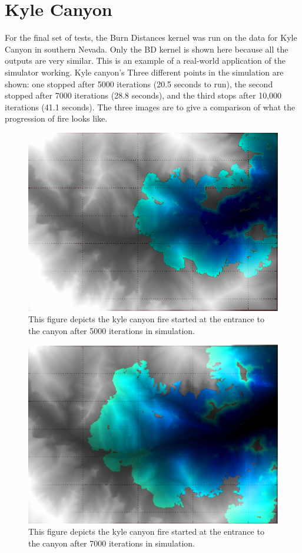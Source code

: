 \section{Kyle Canyon}
For the final set of tests, the Burn Distances kernel was run on the data for Kyle Canyon in southern Nevada. Only the BD kernel is shown here because all the outputs are very similar. This is an example of a real-world application of the simulator working. Kyle canyon's  Three different points in the simulation are shown: one stopped after 5000 iterations (20.5 seconds to run), the second stopped after 7000 iterations (28.8 seconds), and the third stops after 10,000 iterations (41.1 seconds). The three images are to give a comparison of what the progression of fire looks like. 
\begin{figure}%
\centering
  \includegraphics[height=.4\textheight]{figures/results/overlay_5.png}
  \caption{This figure depicts the kyle canyon fire started at the entrance to the canyon after 5000 iterations in simulation.}
  \label{fig:kyle_5000}
\end{figure}  
\begin{figure}%
\centering
  \includegraphics[height=.4\textheight]{figures/results/7000.png}
  \caption{This figure depicts the kyle canyon fire started at the entrance to the canyon after 7000 iterations in simulation.}
  \label{fig:kyle_7000}
\end{figure} 
